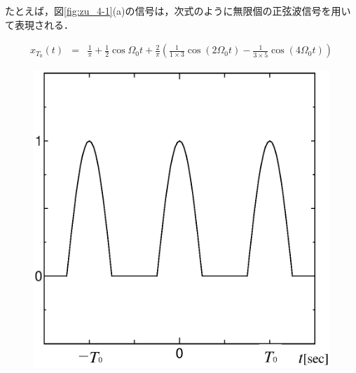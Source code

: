 たとえば，図\ref{fig:zu_4-1}(a)の信号は，次式のように無限個の正弦波信号を用いて表現される．

\begin{eqnarray}
x_{T_0}(t)&=&\frac{1}{\pi} + \frac{1}{2} \cos \Omega_0 t %
 + \frac{2}{\pi} \left ( \frac{1}{1 \times 3} \cos (2\Omega_0 t) - \frac{1}{3 \times 5} \cos (4\Omega_0 t) \right )
\label{eqn:04-1}
\end{eqnarray}

\begin{figure}[H]
\begin{center}
\begin{minipage}{.32\textwidth}
\begin{center}
\includegraphics[width=.98\textwidth]{fig/fig-4-1-a.eps}


\end{center}
\end{minipage}
\end{center}
\end{figure}

